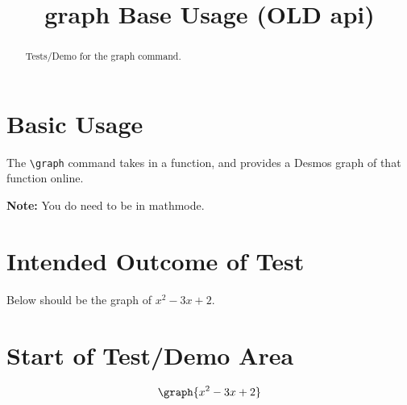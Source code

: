 \documentclass{ximera}
\title{graph Base Usage (OLD api)}
\begin{document}
\begin{abstract}
    Tests/Demo for the graph command.
\end{abstract}
\maketitle

\section{Basic Usage}
The \verb|\graph| command takes in a function, and provides a Desmos graph of that function online.

\textbf{Note:} You do need to be in mathmode.

\section{Intended Outcome of Test}
Below should be the graph of $x^2 - 3x + 2$.

\section{Start of Test/Demo Area}

\[ 
\graph{x^2 - 3x + 2}
\]

\hrulefill
\end{document}
